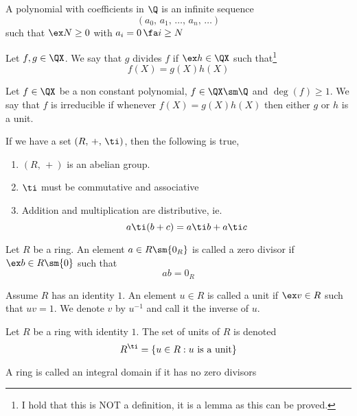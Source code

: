 \documentclass{article}
\begin{document}
\begin{ndefi}[Polynomial]
  A polynomial with coefficients in $\Q$ is an infinite sequence
  $$ (a_0,\,a_1,\,\dots,\,a_n,\,\dots) $$
  such that $\ex N \ge 0$ with $a_i =0\,\fa i \ge N$
\end{ndefi}

\begin{ndefi}[Division]
  Let $f, g \in \QX$. We say that $g$ divides $f$ if $\ex h \in \QX$ such that\footnote{I hold that this is NOT a definition, it is a lemma as this can be proved.}
  $$ f(X) = g(X)h(X) $$
\end{ndefi}

\begin{ndefi}[Irriducible]
  Let $f \in\QX$ be a non constant polynomial, $f \in \QX\sm\Q$ and $\deg(f) \ge 1$. We say that $f$ is irreducible if whenever $f(X) = g(X)h(X)$ then either $g$ or $h$ is a unit.
\end{ndefi}

\begin{ndefi}
  If we have a set $(R,\,+,\,\ti)$, then the following is true,
  \begin{enumerate}
    \item $(R,\,+)$ is an abelian group.
    \item $\ti$ must be commutative and associative
    \item Addition and multiplication are distributive, ie.
    $$ a \ti (b + c) = a \ti b + a \ti c $$
  \end{enumerate}
\end{ndefi}

\begin{ndefi}
  Let $R$ be a ring. An element $a \in R \sm \{0_R\}$ is called a zero divisor if $\ex b \in R \sm \{0\}$ such that
  $$ ab = 0_R $$
\end{ndefi}

\begin{ndefi}[Unit]
  Assume $R$ has an identity $1$. An element $u \in R$ is called a unit if $\ex v \in R$ such that $uv = 1$. We denote $v$ by $u^{-1}$ and call it the inverse of $u$.
\end{ndefi}

\begin{ndefi}
  Let $R$ be a ring with identity $1$. The set of units of $R$ is denoted
  $$ R^\ti = \{u \in R : u \text{ is a unit}\} $$
\end{ndefi}

\begin{ndefi}
  A ring is called an integral domain if it has no zero divisors
\end{ndefi}
\end{document}
